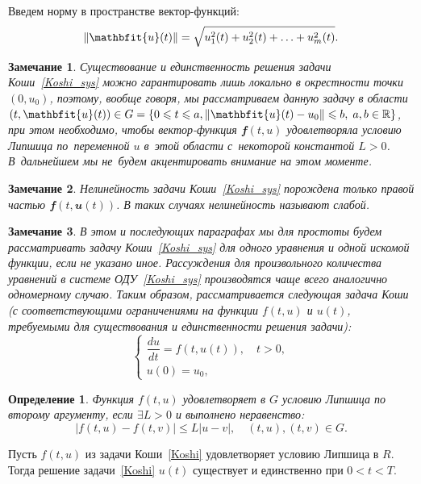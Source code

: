 \documentclass[11pt,a4paper,twoside,listtotoc,bibtotoc]{report}
\numberwithin{equation}{section}
\newtheorem*{definition}{Определение}
\theoremstyle{definition}
\theoremstyle{plain}
\newtheorem{note}{Замечание}[section]
\DeclarePairedDelimiter\norm{\lVert}{\rVert}
\newcommand{\vfunc}[1]{\mathbfit{#1}}
\begin{document}
Введем норму в пространстве вектор-функций:
%
$$
    \norm{\vfunc{u}(t)} = \sqrt{u_1^2(t) + u_2^2(t) + \ldots + u_m^2(t)}.
$$
%
\begin{note}
%
    Существование и единственность решения задачи Коши~\eqref{Koshi_sys} можно
    гарантировать лишь локально в окрестности точки $(0, u_0)$, поэтому, вообще
    говоря, мы рассматриваем данную задачу в области
    $(t, \vfunc{u}(t)) \in G=\{0 \leqslant t \leqslant a,
    \norm{\vfunc{u}(t)-u_0}\leqslant b,\;
    a, b\in\mathbb{R}\}$, при этом необходимо, чтобы вектор-функция
    $\vfunc{f}(t, u)$
    удовлетворяла условию Липшица по~переменной $u$ в~этой области
    с~некоторой константой $L>0$.
    В~дальнейшем мы не~будем акцентировать внимание на этом моменте.
%
\end{note}
%
\begin{note}
%
    Нелинейность задачи Коши~\eqref{Koshi_sys} порождена только правой частью
    $\vfunc{f}(t, \vfunc{u}(t))$. В таких случаях нелинейность называют слабой.
%
\end{note}
%
\begin{note}
%
    В этом и последующих параграфах мы для простоты будем рассматривать задачу
    Коши~\eqref{Koshi_sys} для одного уравнения и одной искомой функции, если
    не указано иное. Рассуждения для произвольного количества уравнений
    в системе ОДУ~\eqref{Koshi_sys} производятся чаще всего аналогично одномерному случаю.
    Таким образом, рассматривается следующая задача Коши (с соответствующими
    ограничениями на функции $f(t, u)$ и $u(t)$, требуемыми для существования
    и единственности решения задачи):
    \begin{equation}
%
    \label{Koshi}
    \begin{cases}
        \dfrac{du}{dt} = f(t, u(t)), \quad t > 0, \\
        u(0) = u_0,
    \end{cases}
\end{equation}
%
%
\end{note}
%
%
\begin{definition}
%
    Функция $f(t,u)$ удовлетворяет в $G$ условию Липшица по второму аргументу,
    если $\exists L > 0$ и выполнено неравенство:
    $$
        |f(t,u) - f(t,v)| \leqslant L|u-v|, \quad (t, u), (t, v)\in G.
    $$
%
\end{definition}
%
Пусть $f(t,u)$ из задачи Коши~\eqref{Koshi} удовлетворяет условию Липшица
в $R$. Тогда решение задачи~\eqref{Koshi} $u(t)$ существует и единственно при
$0 < t < T$.
\fi %
\end{document}
